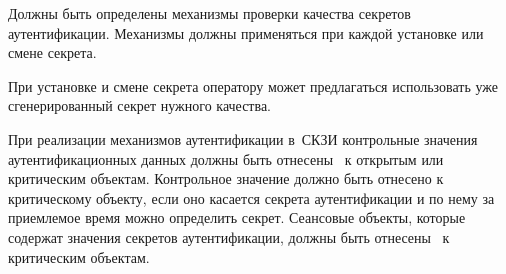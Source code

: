 \label{R.IA.PwdSet} %
Должны быть определены механизмы проверки качества 
секретов аутентификации. Механизмы должны применяться при каждой 
установке или смене секрета.

\begin{note*}
При установке и смене секрета оператору может предлагаться использовать уже
сгенерированный секрет нужного качества.
\end{note*}

\label{R.IA.AuthProtect} %
При реализации механизмов аутентификации в~СКЗИ контрольные значения
аутентификационных данных должны быть отнесены~ к открытым
или критическим объектам.
%
Контрольное значение должно быть отнесено к критическому объекту, 
если оно касается секрета аутентификации и по нему за приемлемое
время можно определить секрет.
%
Сеансовые объекты, которые содержат значения секретов аутентификации,
должны быть отнесены~ к критическим объектам.

